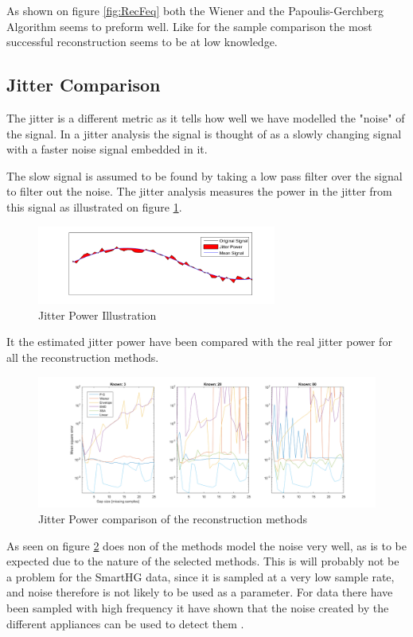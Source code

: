 As shown on figure \ref{fig:RecFeq} both the Wiener and the Papoulis-Gerchberg Algorithm seems to preform well. Like for the sample comparison the most successful reconstruction seems to be at low knowledge. 

\subsection{Jitter Comparison }
\label{T:jitterCom}

The jitter is a different metric as it tells how well we have modelled the "noise" of the signal. In a jitter analysis the signal is thought of as a slowly changing signal with a faster noise signal embedded in it.

The slow signal is assumed to be found by taking a low pass filter over the signal to filter out the noise. The jitter analysis measures the power in the jitter from this signal as illustrated on figure \ref{fig:JitPow}. 

\begin{figure}[H]
\centering
\includegraphics[width=0.7\textwidth]{billeder/JitterPower.png}
\caption{Jitter Power Illustration}
\label{fig:JitPow}
\end{figure}

It the estimated jitter power have been compared with the real jitter power for all the reconstruction methods. 

\begin{figure}[H]
\centering
\includegraphics[width=1\textwidth]{billeder/RecJitter.png}
\caption{Jitter Power comparison of the reconstruction methods}
\label{fig:RecJit}
\end{figure}

As seen on figure \ref{fig:RecJit} does non of the methods model the noise very well, as is to be expected due to the nature of the selected methods. This is will probably not be a problem for the SmartHG data, since it is sampled at a very low sample rate, and noise therefore is not likely to be used as a parameter. For data there have been sampled with high frequency it have shown that the noise created by the different appliances can be used to detect them \citep{RefWorks:17}. 